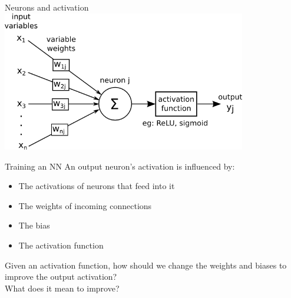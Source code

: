 \documentclass[aspectratio=169]{beamer}
\begin{document}
	\begin{frame}{Neurons and activation}
		\includegraphics[width=0.8\textwidth]{images/activation.png}
	\end{frame}

	\begin{frame}{Training an NN}
		An output neuron's activation is influenced by:
		\begin{itemize}
			\item The activations of neurons that feed into it
			\item The weights of incoming connections
			\item The bias
			\item The activation function
		\end{itemize}
		Given an activation function, how should we change the weights and biases to improve the output activation? \\
		What does it mean to improve?
	\end{frame}
\end{document}
